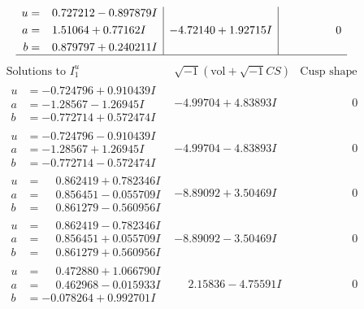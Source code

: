 \documentclass[1p]{elsarticle_modified}
\theoremstyle{definition}
\newcommand{\I}{\sqrt{-1}}
\begin{document}
$$\begin{array}{c|c|c}
\begin{aligned}
u &= \phantom{-}0.727212 - 0.897879 I \\
a &= \phantom{-}1.51064 + 0.77162 I \\
b &= \phantom{-}0.879797 + 0.240211 I\end{aligned}
 & -4.72140 + 1.92715 I & \phantom{-0.000000 } 0\\
 \hline 
 \end{array}$$\newpage$$\begin{array}{c|c|c}  
\text{Solutions to }I^u_{1}& \I (\text{vol} + \sqrt{-1}CS) & \text{Cusp shape}\\
 \hline 
\begin{aligned}
u &= -0.724796 + 0.910439 I \\
a &= -1.28567 - 1.26945 I \\
b &= -0.772714 + 0.572474 I\end{aligned}
 & -4.99704 + 4.83893 I & \phantom{-0.000000 } 0 \\ \hline\begin{aligned}
u &= -0.724796 - 0.910439 I \\
a &= -1.28567 + 1.26945 I \\
b &= -0.772714 - 0.572474 I\end{aligned}
 & -4.99704 - 4.83893 I & \phantom{-0.000000 } 0 \\ \hline\begin{aligned}
u &= \phantom{-}0.862419 + 0.782346 I \\
a &= \phantom{-}0.856451 - 0.055709 I \\
b &= \phantom{-}0.861279 - 0.560956 I\end{aligned}
 & -8.89092 + 3.50469 I & \phantom{-0.000000 } 0 \\ \hline\begin{aligned}
u &= \phantom{-}0.862419 - 0.782346 I \\
a &= \phantom{-}0.856451 + 0.055709 I \\
b &= \phantom{-}0.861279 + 0.560956 I\end{aligned}
 & -8.89092 - 3.50469 I & \phantom{-0.000000 } 0 \\ \hline\begin{aligned}
u &= \phantom{-}0.472880 + 1.066790 I \\
a &= \phantom{-}0.462968 - 0.015933 I \\
b &= -0.078264 + 0.992701 I\end{aligned}
 & \phantom{-}2.15836 - 4.75591 I & \phantom{-0.000000 } 0 \\ \hline\begin{aligned}

\end{aligned}
\end{array}$$
\end{document}
